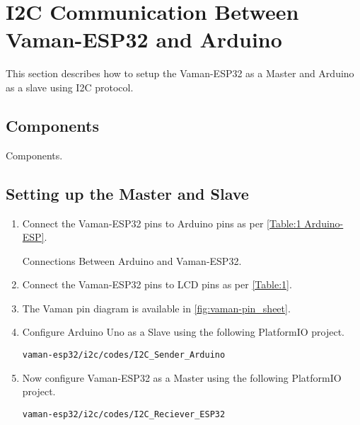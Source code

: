 \section{I2C Communication Between Vaman-ESP32 and Arduino}
This section describes how to setup the Vaman-ESP32 as a Master and Arduino as a
slave using I2C protocol.
\subsection{Components}

\begin{table}[!ht]
\centering

\caption{Components.}
\label{table:i2c-components}
\end{table}

\subsection{Setting up the Master and Slave}
\begin{enumerate}
\item Connect the Vaman-ESP32 pins to Arduino pins as per \autoref{Table:1
Arduino-ESP}.
\begin{table}[!ht]
\centering

\caption{Connections Between Arduino and Vaman-ESP32.}
\label{Table:1 Arduino-ESP}
\end{table}

\item Connect the Vaman-ESP32 pins to LCD pins as per \autoref{Table:1}.

\item The Vaman pin diagram is available in \autoref{fig:vaman-pin_sheet}.

\item Configure Arduino Uno as a Slave using the following PlatformIO project.
\begin{lstlisting}
vaman-esp32/i2c/codes/I2C_Sender_Arduino
\end{lstlisting}
\item
Now configure Vaman-ESP32 as a Master using the following PlatformIO project.
\begin{lstlisting}
vaman-esp32/i2c/codes/I2C_Reciever_ESP32
\end{lstlisting}

\end{enumerate}